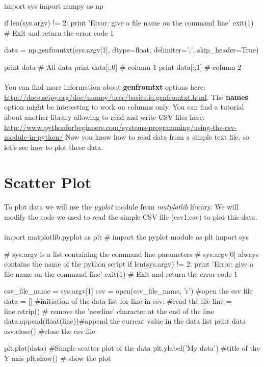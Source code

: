 \documentclass[article,10pt]{scrartcl}
\begin{document}
\paragraph{}

\begin{python}
import sys
import numpy as np

if len(sys.argv) != 2:
   print 'Error: give a file name on the command line'
   exit(1) # Exit and return the error code 1

data = np.genfromtxt(sys.argv[1], dtype=float, delimiter=',', skip_header=True) 

print data # All data
print data[:,0] # column 1
print data[:,1] # column 2

\end{python}
\paragraph{}
You can find more information about \textbf{genfromtxt} options here: \url{http://docs.scipy.org/doc/numpy/user/basics.io.genfromtxt.html}. The \textbf{names} option might be interesting to work on columns only. You can find a tutorial about another library allowing to read and write CSV files here: \url{http://www.pythonforbeginners.com/systems-programming/using-the-csv-module-in-python/}
Now you know how to read data from a simple text file, so let's see how to plot these data.

\section{Scatter Plot}
\paragraph{}
To plot data we will use the \emph{pyplot} module from \emph{matplotlib} library. We will modify the code we used to read the simple CSV file (csv1.csv) to plot this data.
\paragraph{}
\begin{python}
import matplotlib.pyplot as plt # import the pyplot module as plt
import sys

# sys.argv is a list containing the command line parameters
# sys.argv[0] always contains the name of the python script
if len(sys.argv) != 2:
   print 'Error: give a file name on the command line'
   exit(1) # Exit and return the error code 1

csv_file_name = sys.argv[1]
csv = open(csv_file_name, 'r') #open the csv file
data = [] #initiation of the data list
for line in csv: #read the file
   line = line.rstrip() # remove the 'newline' character at the end of the line
   data.append(float(line))#append the current value in the data list
print data
csv.close() #close the csv file

plt.plot(data) #Simple scatter plot of the data
plt.ylabel('My data') #title of the Y axis
plt.show() # show the plot
\end{python}
\end{document}
